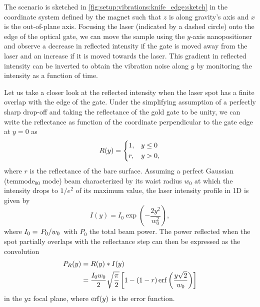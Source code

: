 The scenario is sketched in \cref{fig:setup:vibrations:knife_edge:sketch} in the coordinate system defined by the magnet such that $z$ is along gravity's axis and $x$ is the out-of-plane axis.
Focusing the laser (indicated by a dashed circle) onto the edge of the optical gate, we can move the sample using the $y$-axis nanopositioner and observe a decrease in reflected intensity if the gate is moved away from the laser and an increase if it is moved towards the laser.
This gradient in reflected intensity can be inverted to obtain the vibration noise along $y$ by monitoring the intensity as a function of time.

Let us take a closer look at the reflected intensity when the laser spot has a finite overlap with the edge of the gate.
Under the simplifying assumption of a perfectly sharp drop-off and taking the reflectance of the gold gate to be unity, we can write the reflectance as function of the coordinate perpendicular to the gate edge at $y=0$ as
\begin{equation}\label{eq:setup:reflectance_step}
    R(y) = \begin{dcases}
        1, & y \leq 0 \\
        r, & y > 0,
    \end{dcases}
\end{equation}
where $r$ is the reflectance of the bare  surface.
Assuming a perfect Gaussian (\gls{temmode}$_{00}$ mode) beam characterized by its waist radius $w_0$ at which the intensity drops to $1/e^2$ of its maximum value, the laser intensity profile in 1D is given by
\begin{equation}\label{eq:setup:gaussian}
    I(y) = I_0\exp(-\frac{2y^2}{w_0^2}),
\end{equation}
where $I_0 = \flatfrac{P_0}{w_0}$ with $P_0$ the total beam power.
The power reflected when the spot partially overlaps with the reflectance step can then be expressed as the convolution
\begin{align}\label{eq:setup:knife_edge}
    P_R(y) &= R(y) \ast I(y) \\
           &= \frac{I_0 w_0}{2}\sqrt{\frac{\pi}{2}}\left[ 1 - (1 - r)\erf\left(\frac{y\sqrt{2}}{w_0}\right) \right]
\end{align}
in the $yz$ focal plane, where $\erf(y)$ is the error function.

